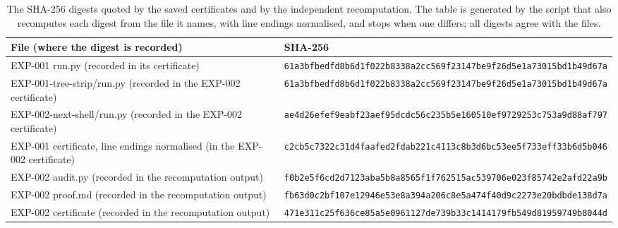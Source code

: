 \begin{table}[ht]
\centering\scriptsize
\setlength{\tabcolsep}{3pt}
\begin{tabular}{p{}p{}}
\toprule
File (where the digest is recorded) & SHA-256\\
\midrule
EXP-001 run.py (recorded in its certificate) & \texttt{61a3bfbedfd8b6d1f022b8338a2cc569}\newline\texttt{f23147be9f26d5e1a73015bd1b49d67a}\\
EXP-001-tree-strip/run.py (recorded in the EXP-002 certificate) & \texttt{61a3bfbedfd8b6d1f022b8338a2cc569}\newline\texttt{f23147be9f26d5e1a73015bd1b49d67a}\\
EXP-002-next-shell/run.py (recorded in the EXP-002 certificate) & \texttt{ae4d26efef9eabf23aef95dcdc56c235}\newline\texttt{b5e160510ef9729253c753a9d88af797}\\
EXP-001 certificate, line endings normalised (in the EXP-002 certificate) & \texttt{c2cb5c7322c31d4faafed2fdab221c41}\newline\texttt{13c8b3d6bc53ee5f733eff33b6d5b046}\\
EXP-002 audit.py (recorded in the recomputation output) & \texttt{f0b2e5f6cd2d7123aba5b8a8565f1f76}\newline\texttt{2515ac539706e023f85742e2afd22a9b}\\
EXP-002 proof.md (recorded in the recomputation output) & \texttt{fb63d0c2bf107e12946e53e8a394a206}\newline\texttt{c8e5a474f40d9c2273e20bdbde138d7a}\\
EXP-002 certificate (recorded in the recomputation output) & \texttt{471e311c25f636ce85a5e0961127de73}\newline\texttt{9b33c1414179fb549d81959749b8044d}\\
\bottomrule
\end{tabular}
\caption{The SHA-256 digests quoted by the saved certificates and by the independent recomputation. The table is generated by the script that also recomputes each digest from the file it names, with line endings normalised, and stops when one differs; all digests agree with the files.}
\label{tab:digests}
\end{table}
